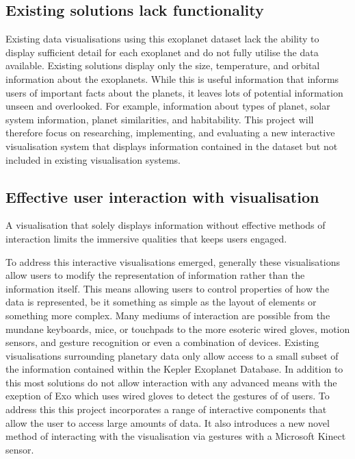 \subsection{Existing solutions lack functionality}
Existing data visualisations using this exoplanet dataset lack the
ability to display sufficient detail for each exoplanet and do not fully utilise
the data available. Existing solutions display only the size, temperature,
and orbital information about the exoplanets. While this is useful information
that informs users of important facts about the planets, it leaves lots of
potential information unseen and overlooked. 
For example, information about types of planet, solar system information,
planet similarities, and habitability. This project will therefore focus on
researching, implementing, and evaluating a new interactive visualisation system
that displays information contained in the dataset but not
included in existing visualisation systems.

\subsection{Effective user interaction with visualisation}
A visualisation that solely displays information without effective methods of
interaction limits the immersive qualities that keeps users engaged.

To address
this interactive visualisations emerged, generally these visualisations allow
users to modify the representation of information rather than the information
itself. This means allowing users to control properties of how the data is
represented, be it something as simple as the layout of elements or something
more complex. Many mediums of interaction are possible from the mundane
keyboards, mice, or touchpads to the more esoteric wired gloves, motion sensors,
and gesture recognition or even a combination of devices. Existing
visualisations surrounding planetary data only allow access to a small subset of
the information contained within the Kepler Exoplanet Database. In addition to
this most solutions do not allow interaction with any advanced means with the
exeption of Exo \cite{exo} which uses wired gloves to detect the gestures of of
users. To address this this project incorporates a range of interactive
components that allow the user to access large amounts of data. It also
introduces a new novel method of interacting with the visualisation via gestures
with a Microsoft Kinect sensor.

